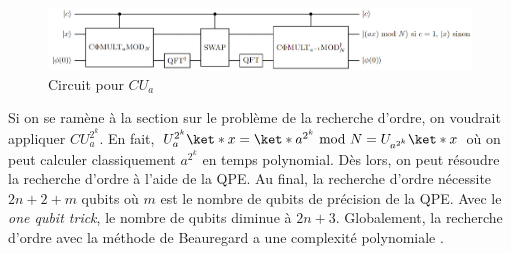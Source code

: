 \begin{figure}[H]
    \centering
    \includegraphics[scale=0.4]{images/CU_x.png}
    \caption{Circuit pour $CU_a$}
\end{figure}

Si on se ramène à la section sur le problème de la recherche d'ordre, on voudrait appliquer $CU_a^{2^k}$. En fait, $U_a^{2^k} \ket*{x} = \ket*{a^{2^k} \text{ mod }N } = U_{a^{2^k}} \ket*{x}$ où on peut calculer classiquement $a^{2^k}$ en temps polynomial. Dès lors, on peut résoudre la recherche d'ordre à l'aide de la QPE. Au final, la recherche d'ordre nécessite $2n + 2 + m$ qubits où $m$ est le nombre de qubits de précision de la QPE. Avec le \textit{one qubit trick}, le nombre de qubits diminue à $2n + 3$. Globalement, la recherche d'ordre avec la méthode de Beauregard a une complexité polynomiale \cite{beauregard2003circuitshorsalgorithmusing}.
